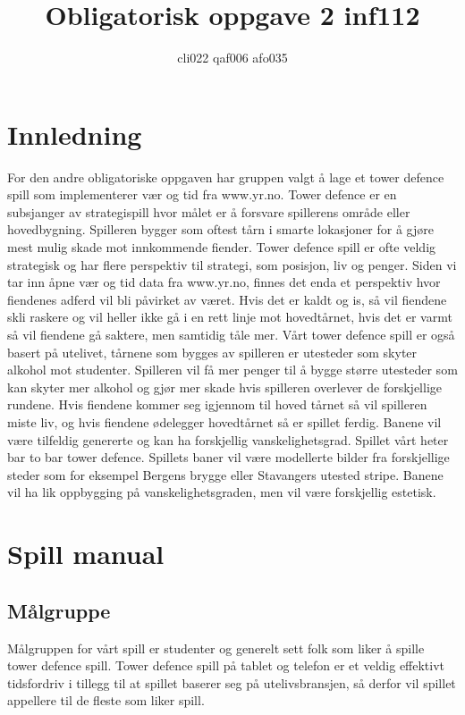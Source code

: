 \documentclass[norsk,a4paper,12 pt]{article}
\title{Obligatorisk oppgave 2 inf112}
\author{cli022 qaf006 afo035}
\begin{document}
\maketitle

\section{Innledning}

For den andre obligatoriske oppgaven har gruppen valgt å lage et tower defence spill som implementerer vær og tid fra www.yr.no.
Tower defence er en subsjanger av strategispill hvor målet er å forsvare spillerens område eller hovedbygning. 
Spilleren bygger som oftest tårn i smarte lokasjoner for å gjøre mest mulig skade mot innkommende fiender.
Tower defence spill er ofte veldig strategisk og har flere perspektiv til strategi, som posisjon, liv og penger.
Siden vi tar inn åpne vær og tid data fra www.yr.no, finnes det enda et perspektiv hvor fiendenes adferd vil bli påvirket av været. 
Hvis det er kaldt og is, så vil fiendene skli raskere og vil heller ikke gå i en rett linje mot hovedtårnet, hvis det er varmt så vil fiendene gå saktere, men samtidig tåle mer.
Vårt tower defence spill er også basert på utelivet, tårnene som bygges av spilleren er utesteder som skyter alkohol mot studenter.
Spilleren vil få mer penger til å bygge større utesteder som kan skyter mer alkohol og gjør mer skade hvis spilleren overlever de forskjellige rundene.
Hvis fiendene kommer seg igjennom til hoved tårnet så vil spilleren miste liv, og hvis fiendene ødelegger hovedtårnet så er spillet ferdig.
Banene vil være tilfeldig genererte og kan ha forskjellig vanskelighetsgrad.
Spillet vårt heter bar to bar tower defence.
Spillets baner vil være modellerte bilder fra forskjellige steder som for eksempel Bergens brygge eller Stavangers utested stripe. Banene vil ha lik oppbygging på vanskelighetsgraden, men vil være forskjellig estetisk.


\section{Spill manual}


\subsection{Målgruppe}


Målgruppen for vårt spill er studenter og generelt sett folk som liker å spille tower defence spill.
Tower defence spill på tablet og telefon er et veldig effektivt tidsfordriv i tillegg til at spillet baserer seg på utelivsbransjen, så derfor vil spillet appellere til de fleste som liker spill.
\end{document}
